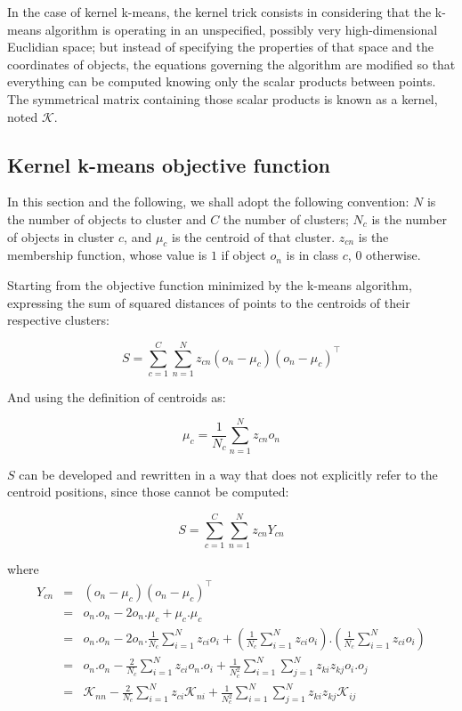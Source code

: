 \documentclass[a4paper,twoside]{article}
\begin{document}
In the case of kernel k-means, the kernel trick consists in considering that the k-means algorithm is operating in an unspecified, possibly very high-dimensional Euclidian space; but instead of specifying the properties of that space and the coordinates of objects, the equations governing the algorithm are modified so that everything can be computed knowing only the scalar products between points. The symmetrical matrix  containing those scalar products is known as a kernel, noted $\mathcal{K}$.

\subsection{Kernel k-means objective function}

In this section and the following, we shall adopt the following convention: $N$ is the number of objects to cluster and $C$ the number of clusters; $N_c$ is the number of objects in cluster $c$, and $\mu_c$ is the centroid of that cluster. $z_{cn}$ is the membership function, whose value is $1$ if object $o_n$ is in class $c$, $0$ otherwise.

Starting from the objective function minimized by the k-means algorithm, expressing the sum of squared distances of points to the centroids of their respective clusters:

\[
S = \sum_{c=1}^{C} \sum_{n=1}^{N} z_{cn} \left(o_n-\mu_c\right)\left(o_n-\mu_c\right)^\top \label{eq:S}
\]

And using the definition of centroids as:

\[
\mu_c = \frac{1}{N_c}\sum_{n=1}^{N}z_{cn}o_n
\]

$S$ can be developed and rewritten in a way that does not explicitly refer to the centroid positions, since those cannot be computed:

\[
S = \sum_{c=1}^{C} \sum_{n=1}^{N} z_{cn} Y_{cn}
\]

where
\begin{eqnarray}
Y_{cn} & = & \left(o_n-\mu_c\right)\left(o_n-\mu_c\right)^\top \\
       & = & o_n.o_n - 2 o_n.\mu_c + \mu_c.\mu_c \\
       & = & o_n.o_n - 2 o_n.\frac{1}{N_c} \sum_{i=1}^{N} z_{ci} o_i +
       	 \left(\frac{1}{N_c} \sum_{i=1}^{N} z_{ci} o_i\right).\left(\frac{1}{N_c} \sum_{i=1}^{N} z_{ci} o_i\right) \\
       & = & o_n.o_n - \frac{2}{N_c} \sum_{i=1}^{N} z_{ci} o_n.o_i +
       	 \frac{1}{N_c^2} \sum_{i=1}^{N} \sum_{j=1}^{N} z_{ki} z_{kj} o_i.o_j \\
       & = & \mathcal{K}_{nn} - \frac{2}{N_c} \sum_{i=1}^{N} z_{ci} \mathcal{K}_{ni} +
         \frac{1}{N_c^2} \sum_{i=1}^{N} \sum_{j=1}^{N} z_{ki} z_{kj} \mathcal{K}_{ij} \label{eq:yki}
\end{eqnarray}
\end{document}
